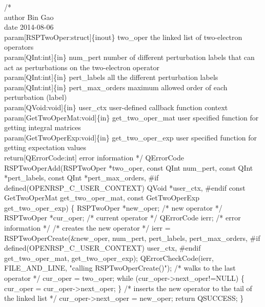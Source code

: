 /*%
    \\author Bin Gao
    \\date 2014-08-06
    \\param[RSPTwoOper:struct]\{inout\} two_oper the linked list of two-electron operators
    \\param[QInt:int]\{in\} num_pert number of different perturbation labels that can
        act as perturbations on the two-electron operator
    \\param[QInt:int]\{in\} pert_labels all the different perturbation labels
    \\param[QInt:int]\{in\} pert_max_orders maximum allowed order of each perturbation (label)
    \\param[QVoid:void]\{in\} user_ctx user-defined callback function context
    \\param[GetTwoOperMat:void]\{in\} get_two_oper_mat user specified function for
        getting integral matrices
    \\param[GetTwoOperExp:void]\{in\} get_two_oper_exp user specified function for
        getting expectation values
    \\return[QErrorCode:int] error information
*/
QErrorCode RSPTwoOperAdd(RSPTwoOper *two_oper,
                         const QInt num_pert,
                         const QInt *pert_labels,
                         const QInt *pert_max_orders,
#if defined(OPENRSP_C_USER_CONTEXT)
                         QVoid *user_ctx,
#endif
                         const GetTwoOperMat get_two_oper_mat,
                         const GetTwoOperExp get_two_oper_exp)
\{
    RSPTwoOper *new_oper;  /* new operator */
    RSPTwoOper *cur_oper;  /* current operator */
    QErrorCode ierr;       /* error information */
    /* creates the new operator */
    ierr = RSPTwoOperCreate(&new_oper,
                            num_pert,
                            pert_labels,
                            pert_max_orders,
#if defined(OPENRSP_C_USER_CONTEXT)
                            user_ctx,
#endif
                            get_two_oper_mat,
                            get_two_oper_exp);
    QErrorCheckCode(ierr, FILE_AND_LINE, "calling RSPTwoOperCreate()");
    /* walks to the last operator */
    cur_oper = two_oper;
    while (cur_oper->next_oper!=NULL) \{
        cur_oper = cur_oper->next_oper;
    \}
    /* inserts the new operator to the tail of the linked list */
    cur_oper->next_oper = new_oper;
    return QSUCCESS;
\}

